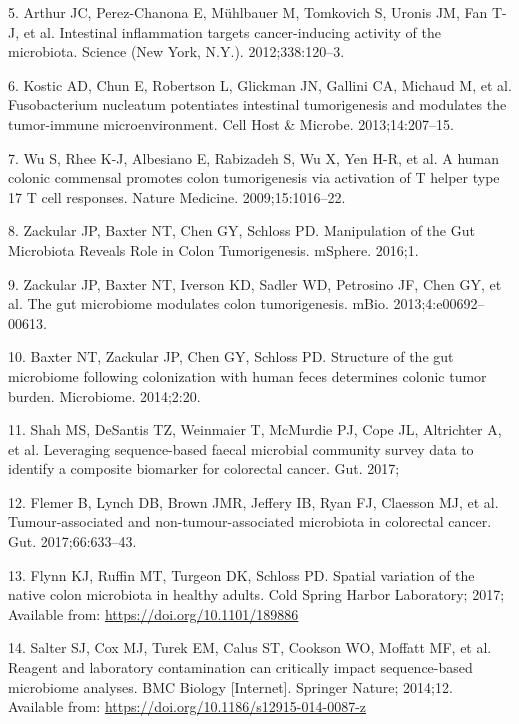 \documentclass[12pt,]{article}
\begin{document}
\hypertarget{ref-arthur_intestinal_2012}{}
5. Arthur JC, Perez-Chanona E, Mühlbauer M, Tomkovich S, Uronis JM, Fan
T-J, et al. Intestinal inflammation targets cancer-inducing activity of
the microbiota. Science (New York, N.Y.). 2012;338:120--3.

\hypertarget{ref-kostic_fusobacterium_2013}{}
6. Kostic AD, Chun E, Robertson L, Glickman JN, Gallini CA, Michaud M,
et al. Fusobacterium nucleatum potentiates intestinal tumorigenesis and
modulates the tumor-immune microenvironment. Cell Host \& Microbe.
2013;14:207--15.

\hypertarget{ref-wu_human_2009}{}
7. Wu S, Rhee K-J, Albesiano E, Rabizadeh S, Wu X, Yen H-R, et al. A
human colonic commensal promotes colon tumorigenesis via activation of T
helper type 17 T cell responses. Nature Medicine. 2009;15:1016--22.

\hypertarget{ref-zackular_manipulation_2016}{}
8. Zackular JP, Baxter NT, Chen GY, Schloss PD. Manipulation of the Gut
Microbiota Reveals Role in Colon Tumorigenesis. mSphere. 2016;1.

\hypertarget{ref-zackular_gut_2013}{}
9. Zackular JP, Baxter NT, Iverson KD, Sadler WD, Petrosino JF, Chen GY,
et al. The gut microbiome modulates colon tumorigenesis. mBio.
2013;4:e00692--00613.

\hypertarget{ref-baxter_structure_2014}{}
10. Baxter NT, Zackular JP, Chen GY, Schloss PD. Structure of the gut
microbiome following colonization with human feces determines colonic
tumor burden. Microbiome. 2014;2:20.

\hypertarget{ref-shah_leveraging_2017}{}
11. Shah MS, DeSantis TZ, Weinmaier T, McMurdie PJ, Cope JL, Altrichter
A, et al. Leveraging sequence-based faecal microbial community survey
data to identify a composite biomarker for colorectal cancer. Gut. 2017;

\hypertarget{ref-flemer_tumour-associated_2017}{}
12. Flemer B, Lynch DB, Brown JMR, Jeffery IB, Ryan FJ, Claesson MJ, et
al. Tumour-associated and non-tumour-associated microbiota in colorectal
cancer. Gut. 2017;66:633--43.

\hypertarget{ref-Flynn_preprint_2017}{}
13. Flynn KJ, Ruffin MT, Turgeon DK, Schloss PD. Spatial variation of
the native colon microbiota in healthy adults. Cold Spring Harbor
Laboratory; 2017; Available from: \url{https://doi.org/10.1101/189886}

\hypertarget{ref-Salter_contamination_2014}{}
14. Salter SJ, Cox MJ, Turek EM, Calus ST, Cookson WO, Moffatt MF, et
al. Reagent and laboratory contamination can critically impact
sequence-based microbiome analyses. BMC Biology {[}Internet{]}. Springer
Nature; 2014;12. Available from:
\url{https://doi.org/10.1186/s12915-014-0087-z}
\end{document}
